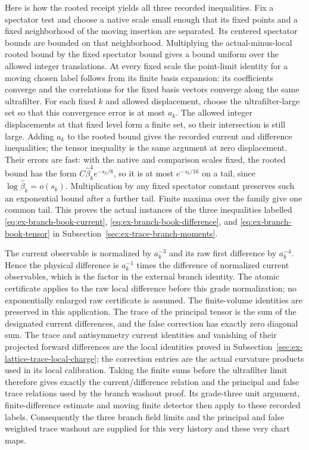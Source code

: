 Here is how the rooted receipt yields all three recorded inequalities.
Fix a spectator test and choose a native scale small enough that its
fixed points and a fixed neighborhood of the moving insertion are
separated. Its centered spectator bounds are bounded on that
neighborhood. Multiplying the actual-minus-local rooted bound by the
fixed spectator bound gives a bound uniform over the allowed integer
translations. At every fixed scale the point-limit identity for a
moving chosen label follows from its finite basis expansion: its
coefficients converge and the correlations for the fixed basis vectors
converge along the same ultrafilter. For each fixed $k$ and allowed displacement, choose the
ultrafilter-large set so that this convergence error is at most $a_k$.
The allowed integer displacements at that fixed level form a finite set,
so their intersection is still large. Adding $a_k$ to the rooted bound
gives the recorded current and difference inequalities; the tensor inequality
is the same argument at zero displacement. Their errors are fast:
with the native and comparison scales fixed, the rooted bound has the
form $C\widehat\beta_k^4e^{-s_k/8}$, so it is at most
$e^{-s_k/16}$ on a tail, since
$\log\widehat\beta_k=o(s_k)$. Multiplication by any fixed spectator
constant preserves such an exponential bound after a further tail.
Finite maxima over the family give one common tail. This proves the
actual instances of the three inequalities labelled
\eqref{eq:ex-branch-book-current},
\eqref{eq:ex-branch-book-difference}, and
\eqref{eq:ex-branch-book-tensor} in Subsection~\ref{sec:ex-trace-branch-moments}.

The current observable is normalized by $a_k^{-3}$ and its raw
first difference by $a_k^{-4}$. Hence the physical difference is
$a_k^{-1}$ times the difference of normalized current observables,
which is the factor in the external branch identity. The atomic
certificate applies to the raw local difference before this grade
normalization; no exponentially enlarged raw certificate is assumed.
The finite-volume identities are preserved in this application. The
trace of the principal tensor is the sum of the designated current
differences, and the false correction has exactly zero diagonal sum.
The trace and antisymmetry current identities and vanishing of their
projected forward differences are the local identities proved in
Subsection~\ref{sec:ex-lattice-trace-local-charge}; the correction entries
are the actual curvature products used in its local calibration.
Taking the finite sums before the ultrafilter limit therefore gives
exactly the current/difference relation and the principal and false
trace relations used by the branch washout proof. Its grade-three
unit argument, finite-difference estimate and moving finite detector
then apply to these recorded labels. Consequently the three branch
field limits and the principal and false weighted trace washout are
supplied for this very history and these very chart maps.

